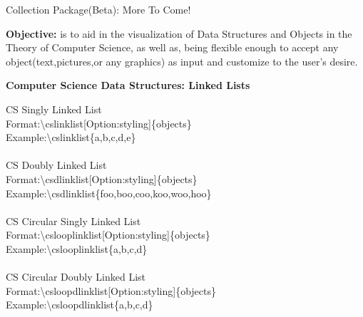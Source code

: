 \documentclass{article}
\begin{document}
\begin{center}
{\Huge Collection Package(Beta): More To Come!}
\end{center}
\indent \textbf{Objective:} is to aid in the visualization of Data Structures and Objects in the Theory of Computer Science, as well as, being flexible enough to accept any object(text,pictures,or any graphics) as input and customize to the user's desire.
\newpage
\begin{center}
\textbf{{\Large Computer Science Data Structures: Linked Lists}}
\end{center}

CS Singly Linked List\\
Format:{\textbackslash}cslinklist[Option:styling]{\{}objects{\}}\\
Example:{\textbackslash}cslinklist{\{}a,b,c,d,e{\}} \newline \\
\begin{adjustbox}{width=0.5\paperwidth,center,keepaspectratio}
\end{adjustbox}\\
CS Doubly Linked List\\
Format:{\textbackslash}csdlinklist[Option:styling]{\{}objects{\}}\\
Example:{\textbackslash}csdlinklist{\{}foo,boo,coo,koo,woo,hoo{\}} \newline \\
\begin{adjustbox}{width=0.5\paperwidth,center,keepaspectratio}
\end{adjustbox}\\
CS Circular Singly Linked List\\
Format:{\textbackslash}cslooplinklist[Option:styling]{\{}objects{\}}\\
Example:{\textbackslash}cslooplinklist{\{}a,b,c,d{\}} \newline \\
\begin{adjustbox}{width=0.5\paperwidth,center,keepaspectratio}
\end{adjustbox}\\
CS Circular Doubly Linked List\\
Format:{\textbackslash}csloopdlinklist[Option:styling]{\{}objects{\}}\\
Example:{\textbackslash}csloopdlinklist{\{}a,b,c,d{\}} \newline \\
\end{document}
